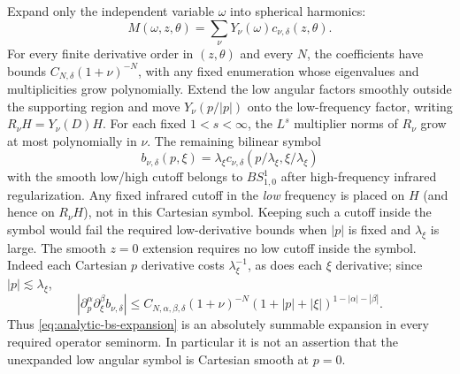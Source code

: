 \documentclass[11pt,a4paper]{article}
\numberwithin{equation}{section}
\newcommand{\ls}{\lesssim}
\theoremstyle{definition}
\begin{document}
Expand only the independent variable $\omega$ into spherical harmonics:
\begin{equation}\label{eq:analytic-bs-expansion}
M(\omega,z,\theta)
=\sum_\nu Y_\nu(\omega)c_{\nu,\delta}(z,\theta).
\end{equation}
For every finite derivative order in $(z,\theta)$ and every $N$, the
coefficients have bounds $C_{N,\delta}(1+\nu)^{-N}$, with any fixed
enumeration whose eigenvalues and multiplicities grow polynomially.
Extend the low angular factors smoothly outside the supporting region and
move $Y_\nu(p/|p|)$ onto the low-frequency factor, writing $R_\nu H=Y_\nu(D)H$.
For each fixed $1<s<\infty$, the $L^s$ multiplier norms of $R_\nu$ grow
at most polynomially in $\nu$. The remaining bilinear symbol
\begin{equation*}
b_{\nu,\delta}(p,\xi)
=\lambda_\xi c_{\nu,\delta}(p/\lambda_\xi,\xi/\lambda_\xi)
\end{equation*}
with the smooth low/high cutoff belongs to $BS^1_{1,0}$ after high-frequency
infrared regularization. Any fixed infrared cutoff in the \emph{low}
frequency is placed on $H$ (and hence on $R_\nu H$), not in this
Cartesian symbol. Keeping such a cutoff inside the symbol would fail the
required low-derivative bounds when $|p|$ is fixed and $\lambda_\xi$ is large.
The smooth $z=0$ extension requires no low cutoff inside the symbol. Indeed each Cartesian $p$ derivative costs
$\lambda_\xi^{-1}$, as does each $\xi$ derivative; since $|p|\ls \lambda_\xi$,
\begin{equation*}
|\partial_p^\alpha\partial_\xi^\beta b_{\nu,\delta}|
\leq C_{N,\alpha,\beta,\delta}(1+\nu)^{-N}
       (1+|p|+|\xi|)^{1-|\alpha|-|\beta|}.
\end{equation*}
Thus \eqref{eq:analytic-bs-expansion} is an absolutely summable expansion in
every required operator seminorm. In particular it is not an assertion
that the unexpanded low angular symbol is Cartesian smooth at $p=0$.
\end{document}
